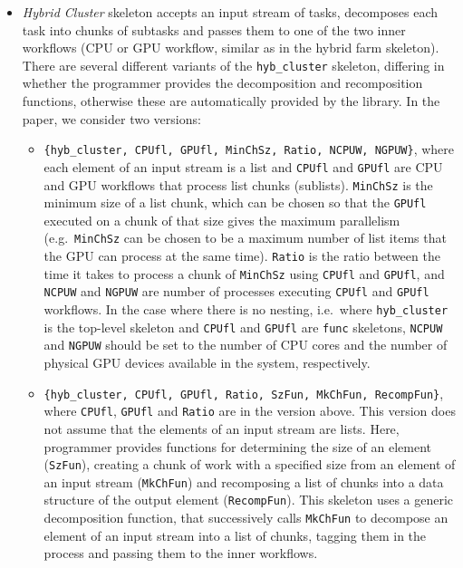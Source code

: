 \documentclass[final]{jfp1}
\begin{document}
\begin{itemize}
\item \emph{Hybrid Cluster} skeleton accepts an input stream
of tasks, decomposes each task into chunks of subtasks and passes them to one of the two inner workflows (CPU or GPU workflow, similar as in the hybrid farm skeleton). There are several different variants of the \lstinline{hyb_cluster}
skeleton, differing in whether the programmer provides the decomposition 
and recomposition functions, otherwise these are automatically provided by the library. In the paper, we consider two versions:
\begin{itemize}
\item \lstinline|{hyb_cluster, CPUfl, GPUfl, MinChSz, Ratio, NCPUW, NGPUW}|,
where each element of an input stream is a list and \lstinline{CPUfl} and 
\lstinline{GPUfl} are CPU and GPU workflows that process list chunks (sublists).
\lstinline{MinChSz} is the minimum size of a list chunk, which can be chosen so that
the \lstinline{GPUfl} executed on a chunk of that size gives the maximum parallelism
(e.g.~\lstinline{MinChSz} can be chosen to be a maximum number of list items that
the GPU can process at the same time). \lstinline{Ratio} is the ratio between the time it
takes to process a chunk of \lstinline{MinChSz} using \lstinline{CPUfl} and 
\lstinline{GPUfl}, and \lstinline{NCPUW} and \lstinline{NGPUW} are number of processes
executing \lstinline{CPUfl} and \lstinline{GPUfl} workflows. In the case where there
is no nesting, i.e.~where \lstinline{hyb_cluster} is the top-level skeleton and 
\lstinline{CPUfl} and \lstinline{GPUfl} are \lstinline{func} skeletons, \lstinline{NCPUW}
and \lstinline{NGPUW} should be set to the number of CPU cores and the number of physical GPU
devices available in the system, respectively.

\item \lstinline|{hyb_cluster, CPUfl, GPUfl, Ratio, SzFun, MkChFun, RecompFun}|, where
 \lstinline{CPUfl}, \lstinline{GPUfl} and \lstinline{Ratio} are in the version above.
This version does not assume that the elements of an input stream are lists. Here, programmer
provides functions for determining the size of an element (\lstinline{SzFun}), creating a
chunk of work with a specified size from an element of an input stream 
(\lstinline{MkChFun}) and recomposing a list of chunks into
a data structure of the output element (\lstinline{RecompFun}). This skeleton uses a generic
decomposition function, that successively calls \lstinline{MkChFun} to decompose an
element of an input stream into a list of chunks, tagging them in the process and passing them
to the inner workflows.
\end{itemize}
\end{itemize}
\end{document}
